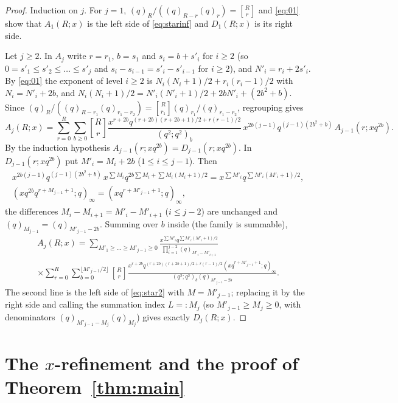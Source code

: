 \documentclass[11pt]{amsart}
\theoremstyle{definition}
\numberwithin{equation}{section}
\newcommand{\qbin}[2]{\genfrac{[}{]}{0pt}{}{#1}{#2}}
\begin{document}
\begin{proof}
Induction on $j$. For $j=1$, $(q)_R/((q)_{R-r}(q)_r)=\qbin Rr$ and \eqref{eq:01} show that $A_1(R;x)$ is the
left side of \eqref{eq:starinf} and $D_1(R;x)$ is its right side.

Let $j\ge2$. In $A_j$ write $r=r_1$, $b=s_1$ and $s_i=b+s'_i$ for $i\ge2$ (so $0=s'_1\le s'_2\le\dots\le s'_j$
and $s_i-s_{i-1}=s'_i-s'_{i-1}$ for $i\ge2$), and $N'_i=r_i+2s'_i$. By \eqref{eq:01} the exponent of
level $i\ge2$ is $N_i(N_i+1)/2+r_i(r_i-1)/2$ with $N_i=N'_i+2b$, and
$N_i(N_i+1)/2=N'_i(N'_i+1)/2+2bN'_i+(2b^2+b)$. Since
$(q)_R/((q)_{R-r_1}(q)_{r_1-r_2})=\qbin R{r_1}(q)_{r_1}/(q)_{r_1-r_2}$, regrouping gives
\begin{equation}\label{eq:31}
A_j(R;x)=\sum_{r=0}^{R}\sum_{b\ge0}\qbin Rr\frac{x^{r+2b}q^{(r+2b)(r+2b+1)/2+r(r-1)/2}}{(q^2;q^2)_b}\,
x^{2b(j-1)}q^{(j-1)(2b^2+b)}\,A_{j-1}(r;xq^{2b}).
\end{equation}
By the induction hypothesis $A_{j-1}(r;xq^{2b})=D_{j-1}(r;xq^{2b})$. In $D_{j-1}(r;xq^{2b})$ put
$M'_i=M_i+2b$ ($1\le i\le j-1$). Then
\begin{gather*}
x^{2b(j-1)}q^{(j-1)(2b^2+b)}\,x^{\sum M_i}q^{2b\sum M_i+\sum M_i(M_i+1)/2}=x^{\sum M'_i}q^{\sum M'_i(M'_i+1)/2},\\
(xq^{2b}q^{r+M_{j-1}+1};q)_\infty=(xq^{r+M'_{j-1}+1};q)_\infty,
\end{gather*}
the differences $M_i-M_{i+1}=M'_i-M'_{i+1}$ ($i\le j-2$) are unchanged and
$(q)_{M_{j-1}}=(q)_{M'_{j-1}-2b}$. Summing over $b$ inside (the family is summable),
\begin{multline*}
A_j(R;x)=\sum_{M'_1\ge\dots\ge M'_{j-1}\ge0}\frac{x^{\sum M'_i}q^{\sum M'_i(M'_i+1)/2}}{\prod_{i=1}^{j-2}(q)_{M'_i-M'_{i+1}}}\\
\times\sum_{r=0}^{R}\sum_{b=0}^{\lfloor M'_{j-1}/2\rfloor}\qbin Rr
\frac{x^{r+2b}q^{(r+2b)(r+2b+1)/2+r(r-1)/2}(xq^{r+M'_{j-1}+1};q)_\infty}{(q^2;q^2)_b(q)_{M'_{j-1}-2b}}.
\end{multline*}
The second line is the left side of \eqref{eq:star2} with $M=M'_{j-1}$; replacing it by the right side
and calling the summation index $L=:M_j$ (so $M'_{j-1}\ge M_j\ge0$, with denominators
$(q)_{M'_{j-1}-M_j}(q)_{M_j}$) gives exactly $D_j(R;x)$.
\end{proof}

\section{The \texorpdfstring{$x$}{x}-refinement and the proof of Theorem~\ref{thm:main}}\label{sec:x}
\end{document}
